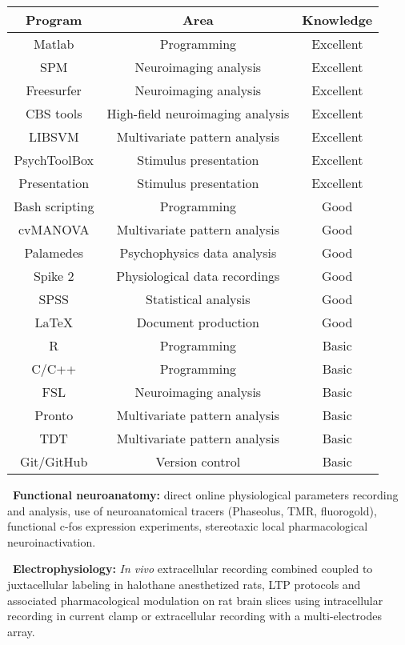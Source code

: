 \documentclass[a4paper,12pt,oneside]{letter}
\begin{document}
{\begin{center}
\begin{tabular}[c]{|c|c|c|}
\hline\hline
Program & Area & Knowledge \\
\hline
Matlab & Programming & Excellent \\ 
SPM & Neuroimaging analysis & Excellent \\
Freesurfer & Neuroimaging analysis & Excellent \\
CBS tools & High-field neuroimaging analysis & Excellent \\
LIBSVM & Multivariate pattern analysis & Excellent \\
PsychToolBox & Stimulus presentation & Excellent \\
Presentation & Stimulus presentation & Excellent \\
Bash scripting & Programming & Good \\
cvMANOVA & Multivariate pattern analysis & Good \\
Palamedes & Psychophysics data analysis & Good \\
Spike 2 & Physiological data recordings & Good \\
SPSS & Statistical analysis & Good \\
\LaTeX & Document production & Good \\
R & Programming & Basic \\
C/C++ & Programming & Basic \\
FSL & Neuroimaging analysis & Basic \\
Pronto & Multivariate pattern analysis & Basic \\
TDT & Multivariate pattern analysis & Basic \\
Git/GitHub & Version control & Basic \\
\hline\hline
\end{tabular} 
\end{center}

\textbullet~\textbf{Functional neuroanatomy:} direct online physiological parameters recording and analysis, use of neuroanatomical tracers (Phaseolus, TMR, fluorogold), functional c-fos expression experiments, stereotaxic local pharmacological neuroinactivation. 

\textbullet~\textbf{Electrophysiology:} \textit{In vivo} extracellular recording combined coupled to juxtacellular labeling in halothane anesthetized rats, LTP protocols and associated pharmacological modulation on rat brain slices using intracellular recording in current clamp or extracellular recording with a multi-electrodes array. 

}
\end{document}
